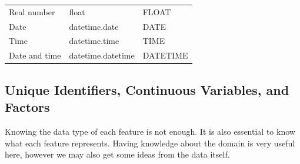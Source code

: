 \documentclass[
]{book}
\theoremstyle{definition}
\theoremstyle{definition}
\theoremstyle{definition}
\theoremstyle{remark}
\begin{document}
\begin{longtable}[]{@{}lll@{}}
\begin{minipage}[t]{0.30\columnwidth}\raggedright
Real number\strut
\end{minipage} & \begin{minipage}[t]{0.30\columnwidth}\raggedright
float\strut
\end{minipage} & \begin{minipage}[t]{0.30\columnwidth}\raggedright
FLOAT\strut
\end{minipage}\tabularnewline
\begin{minipage}[t]{0.30\columnwidth}\raggedright
Date\strut
\end{minipage} & \begin{minipage}[t]{0.30\columnwidth}\raggedright
datetime.date\strut
\end{minipage} & \begin{minipage}[t]{0.30\columnwidth}\raggedright
DATE\strut
\end{minipage}\tabularnewline
\begin{minipage}[t]{0.30\columnwidth}\raggedright
Time\strut
\end{minipage} & \begin{minipage}[t]{0.30\columnwidth}\raggedright
datetime.time\strut
\end{minipage} & \begin{minipage}[t]{0.30\columnwidth}\raggedright
TIME\strut
\end{minipage}\tabularnewline
\begin{minipage}[t]{0.30\columnwidth}\raggedright
Date and time\strut
\end{minipage} & \begin{minipage}[t]{0.30\columnwidth}\raggedright
datetime.datetime\strut
\end{minipage} & \begin{minipage}[t]{0.30\columnwidth}\raggedright
DATETIME\strut
\end{minipage}\tabularnewline
\bottomrule
\end{longtable}

\hypertarget{unique-identifiers-continuous-variables-and-factors}{%
\subsection{Unique Identifiers, Continuous Variables, and Factors}\label{unique-identifiers-continuous-variables-and-factors}}

Knowing the data type of each feature is not enough. It is also essential to know what each feature represents. Having knowledge about the domain is very useful here, however we may also get some ideas from the data itself.
\end{document}
